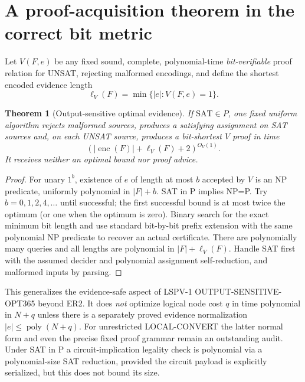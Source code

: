 \documentclass[11pt]{article}
\newtheorem{theorem}{Theorem}
\begin{document}
\section*{A proof-acquisition theorem in the correct bit metric}
Let $V(F,e)$ be any fixed sound, complete, polynomial-time
\emph{bit-verifiable} proof relation for UNSAT, rejecting malformed
encodings, and define the shortest encoded evidence length
\[
  \ell_V(F)=\min\{|e|:V(F,e)=1\}.
\]
\begin{theorem}[Output-sensitive optimal evidence]
If $\mathrm{SAT}\in P$, one fixed uniform algorithm rejects malformed
sources, produces a satisfying assignment on SAT sources and,
on each UNSAT source, produces a \emph{bit-shortest} $V$ proof
in time
\[
  (|\operatorname{enc}(F)|+\ell_V(F)+2)^{O_V(1)}.
\]
It receives neither an optimal bound nor proof advice.
\end{theorem}
\begin{proof}
For unary $1^b$, existence of $e$ of length at most $b$
accepted by $V$ is an NP predicate, uniformly polynomial in
$|F|+b$. SAT in P implies NP=P. Try $b=0,1,2,4,\ldots$
until successful; the first successful bound is at most twice
the optimum (or one when the optimum is zero). Binary search
for the exact minimum bit length and use standard bit-by-bit
prefix extension with the same polynomial NP predicate to
recover an actual certificate. There are polynomially many
queries and all lengths are polynomial in $|F|+\ell_V(F)$.
Handle SAT first with the assumed decider and polynomial
assignment self-reduction, and malformed inputs by parsing.
\end{proof}
This generalizes the evidence-safe aspect of LSPV-1
OUTPUT-SENSITIVE-OPT365 beyond ER2. It does \emph{not} optimize
logical node cost $q$ in time polynomial in $N+q$ unless there
is a separately proved evidence normalization
$|e|\le\operatorname{poly}(N+q)$. For unrestricted LOCAL-CONVERT
the latter normal form and even the precise fixed proof grammar
remain an outstanding audit. Under SAT in P a circuit-implication
legality check is polynomial via a polynomial-size SAT reduction,
provided the circuit payload is explicitly serialized, but this
does not bound its size.
\end{document}

